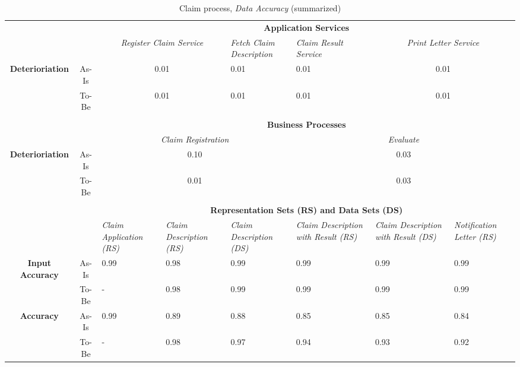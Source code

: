 \begin{center}
\begin{table}[H]
\begin{tabular}{|c|c|p{1.5cm}|p{1.5cm}|p{1.5cm}|p{1.5cm}|p{1.5cm}|p{1.7cm}|}



\cline{3-8}

	\multicolumn{2}{c|}{} & \multicolumn{6}{c|}{\textbf{Application Services}} \\ \cline{3-8}
	\multicolumn{2}{c|}{} & \multicolumn{2}{c|}{\textsl{Register Claim Service}} & \textsl{Fetch Claim Description} & \textsl{Claim Result Service} & \multicolumn{2}{c|}{\textsl{Print Letter Service}} \\ \hline
	\multirow{2}{*}{\textbf{Deterioriation}} & As-Is & \multicolumn{2}{c|}{0.01} & 0.01 & 0.01 & \multicolumn{2}{c|}{0.01} \\ \cline{2-8}
	& To-Be & \multicolumn{2}{c|}{0.01} & 0.01 & 0.01 & \multicolumn{2}{c|}{0.01} \\ \hline


	\multicolumn{8}{c}{} \\ \cline{3-8}
	\multicolumn{2}{c|}{} & \multicolumn{6}{c|}{\textbf{Business Processes}} \\ \cline{3-8}
	\multicolumn{2}{c|}{} & \multicolumn{3}{c|}{\textsl{Claim Registration}} & \multicolumn{3}{c|}{\textsl{Evaluate}} \\ \hline
	\multirow{2}{*}{\textbf{Deterioriation}} & As-Is & \multicolumn{3}{c|}{0.10} & \multicolumn{3}{c|}{0.03} \\ \cline{2-8}
	& To-Be & \multicolumn{3}{c|}{0.01} & \multicolumn{3}{c|}{0.03} \\ \hline

	\multicolumn{8}{c}{} \\ \cline{3-8}
	\multicolumn{2}{c|}{} & \multicolumn{6}{c|}{\textbf{Representation Sets (RS) and Data Sets (DS)}} \\ \cline{3-8}
	\multicolumn{2}{c|}{} & \textsl{Claim Application (RS)} & \textsl{Claim Description (RS)} & \textsl{Claim Description (DS)} & \textsl{Claim Description with Result (RS)} & \textsl{Claim Description with Result (DS)} & \textsl{Notification Letter (RS)}\\
	\hline
	\multirow{2}{*}{\textbf{Input Accuracy}} & As-Is & 0.99 & 0.98 & 0.99 & 0.99 & 0.99 & 0.99\\ \cline{3-8} \cline{2-2}
	& To-Be & - & 0.98 & 0.99 & 0.99 & 0.99 & 0.99\\ \hline
	\multirow{2}{*}{\textbf{Accuracy}} & As-Is & 0.99 & 0.89 & 0.88 & 0.85 & 0.85 & 0.84\\ \cline{3-8} \cline{2-2}
	& To-Be & - &0.98 & 0.97 & 0.94 & 0.93 & 0.92\\ \hline


\end{tabular}
\caption{Claim process, \textsl{Data Accuracy} (summarized)}
\label{tab:claim_both}
\end{table}
\end{center}